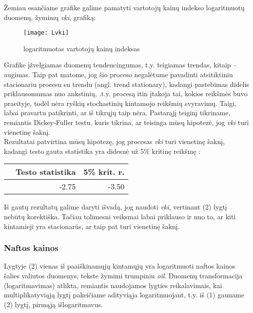 \documentclass[a4paper]{article}
\begin{document}
Žemiau esančiame grafike galime pamatyti vartotojų kainų indekso logaritmuotų duomenų, žymimų \textit{vki}, grafiką:

\begin{figure}[!h]
\centering
\texttt{[image: Lvki]}
\caption{logaritmuotas vartotojų kainų indeksas}
\end{figure}
 
\indent Grafike įžvelgiamas duomenų tendencingumas, t.y. teigiamas trendas, kitaip – augimas. Taip pat matome, jog šio proceso negalėtume pavadinti atsitiktiniu stacionariu procesu su trendu (angl. trend stationary), kadangi pastebimas didelis priklausomumas nuo ankstinių, .t.y. procesą itin įtakoja tai, kokios reikšmės buvo praeityje, todėl nėra ryškių stochastinių kintamojo reikšmių svyravimų. Taigi, labai pravartu patikrinti, ar iš tikrųjų taip nėra. Pastarąjį teiginį tikriname, remiantis Dickey-Fuller testu, kuris tikrina, ar teisinga mūsų hipotezė, jog \textit{vki} turi vienetinę šaknį.\\ Rezultatai patvirtina mūsų hipotezę, jog procesas \textit{vki} turi vienetinę šaknį, kadangi testo gauta statistika yra didesnė už 5\% kritinę reikšmę :

\begin{table}[!h]
\begin{center}
\begin{tabular}{rrr}
  \hline
 & Testo statistika & 5\% krit. r. \\ 
  \hline
 & -2.75 & -3.50 \\ 
   \hline
\end{tabular}
\end{center}
\end{table}

\indent Iš gautų rezultatų galime daryti išvadą, jog naudoti \textit{vki}, vertinant (2) lygtį nebūtų korektiška. Tačiau tolimesni veiksmai labai priklauso ir nuo to, ar kiti kintamieji yra stacionarūs, ar taip pat turi vienetinę šaknį.

\newpage \subsubsection{Naftos kainos} \indent
		
Lygtyje (2) vienas iš paaiškinamųjų kintamųjų yra logaritmuoti naftos kainos šalies valiutos duomenys, tekste žymimi trumpiniu \textit{oil}. Duomenų transformacija (logaritmavimas) atlikta, remiantis naudojamos lygties reikalavimais, kai multiplikatyviąją lygtį pakeičiame adityviąja logaritmuojant, t.y. iš (1) gauname (2) lygtį, pirmąją išlogaritmavus.
\end{document}
